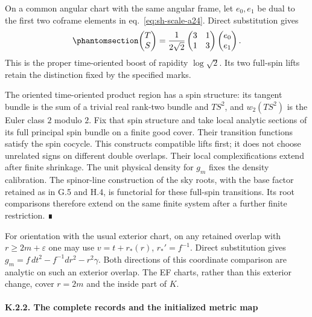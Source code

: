 \documentclass[
  english,
  11pt,
  reqno]{amsart}
\begin{document}
On a common angular chart with the same angular frame, let \(e_0,e_1\)
be dual to the first two coframe elements in eq.~\ref{eq:sh-scale-a24}.
Direct substitution gives
\begin{equation}\protect\phantomsection\label{eq:sh-r29-radial-frame-boost}{
 \begin{pmatrix}T\\S\end{pmatrix}
 =\frac1{2\sqrt2}
  \begin{pmatrix}3&1\\1&3\end{pmatrix}
  \begin{pmatrix}e_0\\e_1\end{pmatrix}.
}\end{equation} This is the proper time-oriented boost of rapidity
\(\log\sqrt2\). Its two full-spin lifts retain the distinction fixed by
the specified marks.

The oriented time-oriented product region has a spin structure: its
tangent bundle is the sum of a trivial real rank-two bundle and
\(TS^2\), and \(w_2(TS^2)\) is the Euler class \(2\) modulo \(2\). Fix
that spin structure and take local analytic sections of its full
principal spin bundle on a finite good cover. Their transition functions
satisfy the spin cocycle. This constructs compatible lifts first; it
does not choose unrelated signs on different double overlaps. Their
local complexifications extend after finite shrinkage. The unit physical
density for \(g_m\) fixes the density calibration. The spinor-line
construction of the sky roots, with the base factor retained as in G.5
and H.4, is functorial for these full-spin transitions. Its root
comparisons therefore extend on the same finite system after a further
finite restriction. ∎

For orientation with the usual exterior chart, on any retained overlap
with \(r\ge 2m+\varepsilon\) one may use \(v=t+r_*(r)\),
\(r_*'=f^{-1}\). Direct substitution gives
\(g_m=f\,dt^2-f^{-1}dr^2-r^2\gamma\). Both directions of this coordinate
comparison are analytic on such an exterior overlap. The EF charts,
rather than this exterior change, cover \(r=2m\) and the inside part of
\(K\).

\protect{}\label{sec:schw-bc-all-records}

\protect{}\label{sec:sh-comparison-2}

\paragraph{K.2.2. The complete records and the initialized metric
map}\label{k.2.2.-the-complete-records-and-the-initialized-metric-map}
\end{document}
